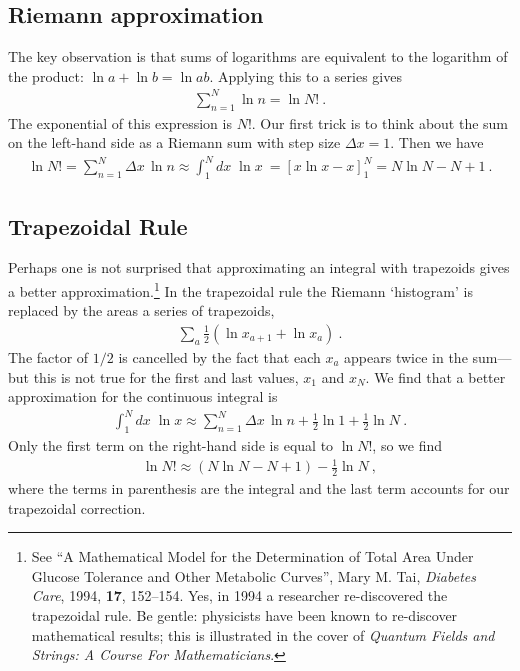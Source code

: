 \documentclass[
  11pt,
	colorful,
	raggedright,
]{tufte-style-thesis-flip}
\begin{document}
\subsection{Riemann approximation}

The key observation is that sums of logarithms are equivalent to the logarithm of the product: $\ln a + \ln b = \ln ab$.  Applying this to a series gives
\begin{align}
  \sum_{n=1}^N \ln n = \ln N! \ .
\end{align}
The exponential of this expression is $N!$. Our first trick is to think about the sum on the left-hand side as a Riemann sum with step size $\Delta x = 1$. Then we have
\begin{align}
  \ln N! = \sum_{n=1}^N \Delta x\, \ln n
  \approx \int_1^N dx\; \ln x \ 
  = 
  \left[x\ln x - x\right]^N_1
  = 
  N\ln N - N+1 \ .
\end{align}

\subsection{Trapezoidal Rule}

Perhaps one is not surprised that approximating an integral with trapezoids gives a better approximation.\footnote{See “A Mathematical Model for the Determination of Total Area Under Glucose Tolerance and Other Metabolic Curves”, Mary M. Tai, \emph{Diabetes Care}, 1994, \textbf{17}, 152–154. Yes, in 1994 a researcher re-discovered the trapezoidal rule. Be gentle: physicists have been known to re-discover mathematical results; this is illustrated in the cover of \emph{Quantum Fields and Strings: A Course For Mathematicians}.} In the trapezoidal rule the Riemann `histogram' is replaced by the areas a series of trapezoids, 
\begin{align}
 \sum_a \frac{1}{2}\left(\ln x_{a+1} + \ln x_a\right) \ .
\end{align}
The factor of $1/2$ is cancelled by the fact that each $x_a$ appears twice in the sum---but this is not true for the first and last values, $x_1$ and $x_N$. 
We find that a better approximation for the continuous integral is
\begin{align}
  \int_1^N dx\; \ln x \approx \sum_{n=1}^N \Delta x\, \ln n + \frac{1}{2}\ln 1 + \frac{1}{2} \ln N \ .
\end{align}
Only the first term on the right-hand side is equal to $\ln N!$, so we find
\begin{align}
  \ln N! \approx 
  \left(N\ln N - N+1\right) - \frac{1}{2}\ln N \ , 
\end{align}
where the terms in parenthesis are the integral and the last term accounts for our trapezoidal correction.
\end{document}
